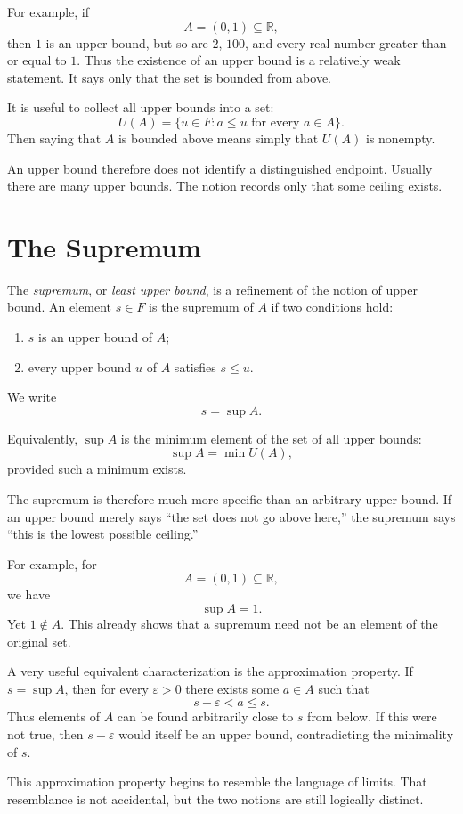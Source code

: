 \documentclass{essay}
\begin{document}
For example, if
\[
    A=(0,1)\subseteq\mathbb{R},
\]
then $1$ is an upper bound, but so are $2$, $100$, and every real number greater than or equal to $1$. Thus the existence of an upper bound is a relatively weak statement. It says only that the set is bounded from above.

It is useful to collect all upper bounds into a set:
\[
    U(A)=\{u\in F : a\leq u\text{ for every }a\in A\}.
\]
Then saying that $A$ is bounded above means simply that $U(A)$ is nonempty.

An upper bound therefore does not identify a distinguished endpoint. Usually there are many upper bounds. The notion records only that some ceiling exists.

\section{The Supremum}

The \emph{supremum}, or \emph{least upper bound}, is a refinement of the notion of upper bound. An element $s\in F$ is the supremum of $A$ if two conditions hold:
\begin{enumerate}
    \item $s$ is an upper bound of $A$;
    \item every upper bound $u$ of $A$ satisfies $s\leq u$.
\end{enumerate}

We write
\[
    s=\sup A.
\]

Equivalently, $\sup A$ is the minimum element of the set of all upper bounds:
\[
    \sup A=\min U(A),
\]
provided such a minimum exists.

The supremum is therefore much more specific than an arbitrary upper bound. If an upper bound merely says ``the set does not go above here,'' the supremum says ``this is the lowest possible ceiling.''

For example, for
\[
    A=(0,1)\subseteq\mathbb{R},
\]
we have
\[
    \sup A=1.
\]
Yet $1\notin A$. This already shows that a supremum need not be an element of the original set.

A very useful equivalent characterization is the approximation property. If $s=\sup A$, then for every $\varepsilon>0$ there exists some $a\in A$ such that
\[
    s-\varepsilon<a\leq s.
\]
Thus elements of $A$ can be found arbitrarily close to $s$ from below. If this were not true, then $s-\varepsilon$ would itself be an upper bound, contradicting the minimality of $s$.

This approximation property begins to resemble the language of limits. That resemblance is not accidental, but the two notions are still logically distinct.
\end{document}
